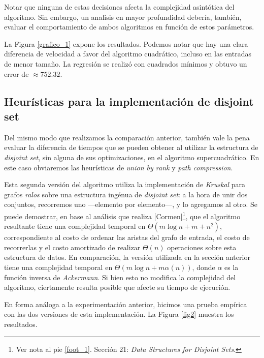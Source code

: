 Notar que ninguna de estas decisiones afecta la complejidad asintótica del algoritmo. Sin embargo, un analisis en mayor profundidad debería, también, evaluar el comportamiento de ambos algoritmos en función de estos parámetros.

La Figura \ref{grafico_1} expone los resultados. Podemos notar que hay una clara diferencia de velocidad a favor del algoritmo cuadrático, incluso en las entradas de menor tamaño. La regresión se realizó con cuadrados mínimos y obtuvo un error de $\approx 752.32$. %

\subsection{Heurísticas para la implementación de disjoint set}

Del mismo modo que realizamos la comparación anterior, también vale la pena evaluar la diferencia de tiempos que se pueden obtener al utilizar la estructura de \textit{disjoint set}, sin alguna de sus optimizaciones, en el algoritmo supercuadrático. En este caso obviaremos las heurísticas de \textit{union by rank} y \textit{path compression}. 

Esta segunda versión del algoritmo utiliza la implementación de \textit{Kruskal} para grafos \textit{ralos} sobre una estructura ingénua de \textit{disjoint set}: a la hora de unir dos conjuntos, recorremos uno ---elemento por elemento---, y lo agregamos al otro. Se puede demostrar, en base al análisis que realiza [Cormen]\footnote{Ver nota al pie \ref{foot_1}. Sección 21: \textit{Data Structures for Disjoint Sets}.}, que el algoritmo resultante tiene una complejidad temporal en $\Theta(m\log n + m + n^2)$, correspondiente al costo de ordenar las aristas del grafo de entrada, el costo de recorrerlas y el costo amortizado de realizar $\Theta(n)$ operaciones sobre esta estructura de datos. En comparación, la versión utilizada en la sección anterior tiene una complejidad temporal en $\Theta(m\log n + m\alpha(n))$, donde $\alpha$ es la función inversa de \textit{Ackermann}. Si bien esto no modifica la complejidad del algoritmo, ciertamente resulta posible que afecte su tiempo de ejecución.

En forma análoga a la experimentación anterior, hicimos una prueba empírica con las dos versiones de esta implementación. La Figura \ref{fig2} muestra los resultados.


